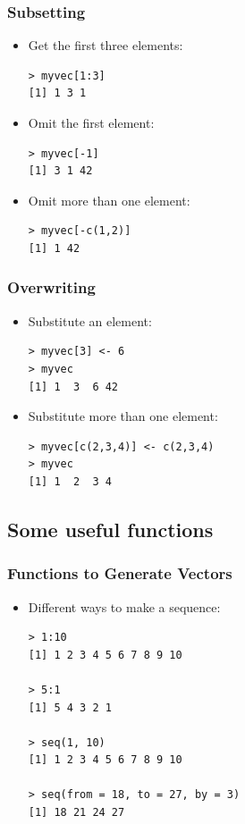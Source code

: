 \documentclass[xcolor=dvipsnames, xcolor=table]{beamer} %
\theoremstyle{mystyle}
\begin{document}
\begin{frame}[fragile] %
\frametitle{Subsetting}
\begin{itemize}
\item Get the first three elements:
\begin{verbatim}
> myvec[1:3]
[1] 1 3 1
\end{verbatim}
\item Omit the first element:
\begin{verbatim}
> myvec[-1]
[1] 3 1 42
\end{verbatim}
\item Omit more than one element:
\begin{verbatim}
> myvec[-c(1,2)]
[1] 1 42
\end{verbatim}

\end{itemize}

\end{frame}

\begin{frame}[fragile] %

\frametitle{Overwriting}

\begin{itemize}

\item Substitute an element:
\begin{verbatim}
> myvec[3] <- 6
> myvec
[1] 1  3  6 42
\end{verbatim}

\item Substitute more than one element:
\begin{verbatim}
> myvec[c(2,3,4)] <- c(2,3,4)
> myvec
[1] 1  2  3 4
\end{verbatim}
\end{itemize}

\end{frame}

\subsection{Some useful functions}

\begin{frame}[fragile] %
\frametitle{Functions to Generate Vectors}
\begin{itemize}

\item Different ways to make a sequence:

\begin{verbatim}
> 1:10
[1] 1 2 3 4 5 6 7 8 9 10

> 5:1
[1] 5 4 3 2 1

> seq(1, 10)
[1] 1 2 3 4 5 6 7 8 9 10

> seq(from = 18, to = 27, by = 3)
[1] 18 21 24 27
\end{verbatim}

\end{itemize}

\end{frame}
\end{document}
